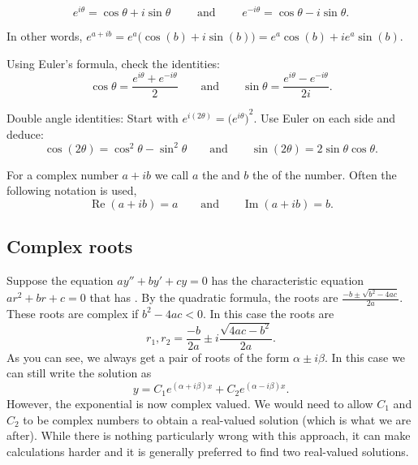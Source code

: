 \documentclass[12pt]{book}
\begin{document}
\begin{theorem} \label{eulersformula}
\begin{equation*}
\boxed{~~
e^{i \theta} = \cos \theta + i \sin \theta
\qquad \text{ and } \qquad
e^{- i \theta} = \cos \theta - i \sin \theta .
~~}
\end{equation*}
\end{theorem}

In other words, $e^{a+ib} = e^a \bigl( \cos(b) + i \sin(b) \bigr) = e^a \cos(b) + i e^a \sin(b)$.

\begin{exercise}
Using Euler's formula, check the identities:
\begin{equation*}
\cos \theta = \frac{e^{i \theta} + e^{-i \theta}}{2}
\qquad \text{and} \qquad
\sin \theta = \frac{e^{i \theta} - e^{-i \theta}}{2i}.
\end{equation*}
\end{exercise}

\begin{exercise}
Double angle identities:
Start with $e^{i(2\theta)} = {\bigl(e^{i \theta} \bigr)}^2$.  Use Euler on
each side and deduce:
\begin{equation*}
\cos (2\theta) = \cos^2 \theta - \sin^2 \theta
\qquad \text{and} \qquad
\sin (2\theta) = 2 \sin \theta \cos \theta .
\end{equation*}
\end{exercise}

For a complex number $a+ib$ we call
$a$ the \emph{} and $b$ the \emph{} of the number.
Often the following notation is used,
\begin{equation*}
\operatorname{Re}(a+ib) = a
\qquad \text{and} \qquad
\operatorname{Im}(a+ib) = b.
\end{equation*}

\subsection{Complex roots}

Suppose the equation $ay'' + by' + cy = 0$ has the 
characteristic equation
$a r^2 + b r + c = 0$ that has .
By the quadratic
formula, the roots are
$\frac{-b \pm \sqrt{b^2 - 4ac}}{2a}$.
These roots are complex if $b^2 - 4ac < 0$.  In this case the
roots are
\begin{equation*}
r_1, r_2 = \frac{-b}{2a} \pm i\frac{\sqrt{4ac - b^2}}{2a} .
\end{equation*}
As you can see, we always get a pair of roots of the form $\alpha \pm i
\beta$.  In this case we can still write the solution as
\begin{equation*}
y = C_1 e^{(\alpha+i\beta)x} + C_2 e^{(\alpha-i\beta)x} .
\end{equation*}
However, the exponential is now complex valued.  We would need to allow
$C_1$ and $C_2$ to be complex numbers to obtain a real-valued solution (which
is what we are after).  While there is nothing particularly wrong with this
approach,
it can make calculations harder and it is generally preferred
to find two real-valued
solutions.
\end{document}
